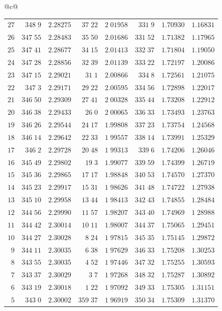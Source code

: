 \begin{center}
{\begin{tabular}{@{}c@{}}
\begin{tabular}{r|r|r|r|r|r|r|r}
$27$&$348\;9$&$2.28275$&$37\;22$&$2\;01958$&$331\;9$&$1.70930$&$1.16831$\\
$26$&$347\;55$&$2.28483$&$35\;50$&$2.01686$&$331\;52$&$1.71382$&$1.17965$\\[2pt]
$25$&$347\;41$&$2.28677$&$34\;15$&$2.01413$&$332\;37$&$1.71804$&$1.19050$\\
$24$&$347\;28$&$2.28856$&$32\;39$&$2.01139$&$333\;22$&$1.72197$&$1.20086$\\
$23$&$347\;15$&$2.29021$&$31\;1$&$2.00866$&$334\;8$&$1.72561$&$1.21075$\\
$22$&$347\;3$&$2.29171$&$29\;22$&$2.00595$&$334\;56$&$1.72898$&$1.22017$\\
$21$&$346\;50$&$2.29309$&$27\;41$&$2\;00328$&$335\;44$&$1.73208$&$1.22912$\\[2pt]
$20$&$346\;38$&$2.29433$&$26\;0$&$2\;00065$&$336\;33$&$1.73493$&$1.23763$\\
$19$&$346\;26$&$2.29544$&$24\;17$&$1.99808$&$337\;23$&$1.73754$&$1.24568$\\
$18$&$346\;14$&$2.29642$&$22\;33$&$1\;99557$&$338\;14$&$1.73991$&$1.25329$\\
$17$&$346\;2$&$2.29728$&$20\;48$&$1\;99313$&$339\;6$&$1.74206$&$1.26046$\\
$16$&$345\;49$&$2.29802$&$19\;3$&$1.99077$&$339\;59$&$1.74399$&$1.26719$\\[2pt]
$15$&$345\;36$&$2.29865$&$17\;17$&$1.98848$&$340\;53$&$1.74570$&$1.27370$\\
$14$&$345\;23$&$2.29917$&$15\;31$&$1\;98626$&$341\;48$&$1.74722$&$1.27938$\\
$13$&$345\;10$&$2.29958$&$13\;44$&$1\;98413$&$342\;43$&$1.74855$&$1.28484$\\
$12$&$344\;56$&$2.29990$&$11\;57$&$1.98207$&$343\;40$&$1.74969$&$1\;28988$\\
$11$&$344\;42$&$2.30014$&$10\;11$&$1.98007$&$344\;37$&$1.75065$&$1.29451$\\[2pt]
$10$&$344\;27$&$2.30028$&$8\;24$&$1\;97815$&$345\;35$&$1.75145$&$1.29872$\\
$9$&$344\;11$&$2.30035$&$6\;38$&$1\;97629$&$346\;33$&$1.75208$&$1.30253$\\
$8$&$343\;55$&$2.30035$&$4\;52$&$1\;97446$&$347\;32$&$1.75255$&$1.30593$\\
$7$&$343\;37$&$2.30029$&$3\;7$&$1\;97268$&$348\;32$&$1.75287$&$1.30892$\\
$6$&$343\;19$&$2.30018$&$1\;22$&$1\;97092$&$349\;33$&$1.75305$&$1.31151$\\[2pt]
$5$&$343\;0$&$2.30002$&$359\;37$&$1\;96919$&$350\;34$&$1.75309$&$1.31370$\\

\end{tabular}
\end{tabular}}
\end{center}
